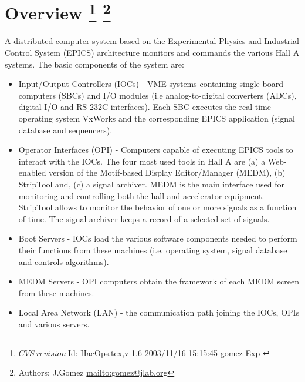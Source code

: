 \section[Overview]{Overview
\footnote{
  $CVS~revision~ $Id: HacOps.tex,v 1.6 2003/11/16 15:15:45 gomez Exp $ $
}
\footnote{Authors: J.Gomez \url{mailto:gomez@jlab.org}}
}


A distributed computer system
based on the 
Experimental Physics and Industrial Control System 
(EPICS)
 architecture monitors and commands
the various Hall A systems. The basic components of the system are:
\begin{itemize}
\item Input/Output Controllers (IOCs) - VME systems containing single
board computers (SBCs) and I/O modules
(i.e analog-to-digital converters (ADCs), digital I/O and RS-232C interfaces).
Each SBC executes the real-time operating system VxWorks and the corresponding EPICS application (signal database
and sequencers).
\item Operator Interfaces (OPI) - Computers capable of executing
EPICS tools to interact with the IOCs.
The four most used tools in Hall A are (a)
a Web-enabled version of the Motif-based Display Editor/Manager (MEDM), (b) StripTool and, (c) a signal archiver.
MEDM is the main interface used for monitoring and controlling both the hall and accelerator
equipment. StripTool allows to monitor 
the behavior of one or more signals as a function of time. 
The signal archiver keeps a record of a selected set of signals.
\item Boot Servers - IOCs load the various
software components needed to perform their functions from these machines (i.e. operating system,
signal database and controls algorithms).
\item MEDM Servers - OPI computers obtain the framework of each MEDM screen from these machines.
\item Local Area Network (LAN) - the communication path joining the IOCs, OPIs and various servers.
\end{itemize}

